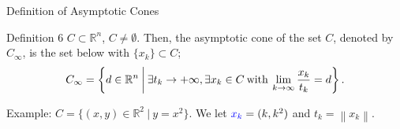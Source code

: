 \documentclass[aspectratio=169, dvipdfmx, 11pt]{beamer} %
\begin{document}
\begin{frame}{Definition of Asymptotic Cones}
  \begin{block}{Definition 6}
    $C \subset \mathbb{R}^n$, $C \neq \emptyset$. Then, the asymptotic cone of the set $C$, denoted by $C_\infty$, is the set below with $\{ x_k \} \subset C$;
    \begin{equation}
      C_\infty = \left\{ d \in
      \mathbb{R}^n \:\middle|\: \exists t_k \rightarrow +\infty, \exists x_k \in C \:\text{\rm with}\: \lim_{k \to \infty} \frac{x_k}{t_k} = d \right\}. \notag
    \end{equation}
  \end{block}

  Example: $C = \{(x,y) \in \mathbb{R}^2 \:|\: y=x^2\}$. We let $\textcolor{blue}{x_k} = (k, k^2)$ and $t_k = \left\lVert x_k \right\rVert$.


\end{frame}
\end{document}
